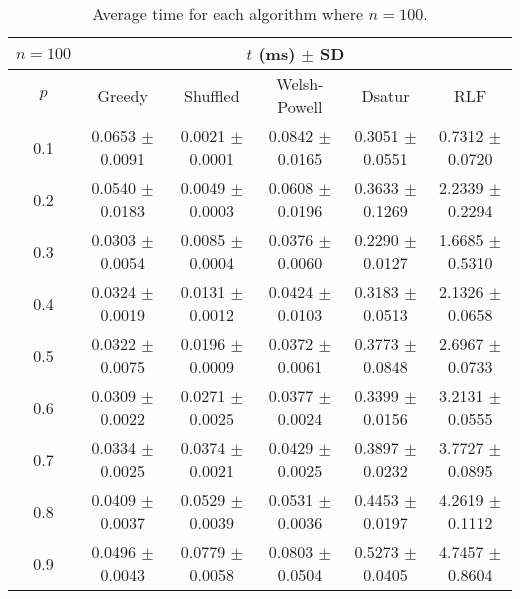 \begin{table}[H]
    \centering
    \begin{tabular}{cccccc}
        
        $n = 100$& \multicolumn{5}{c}{$t$ (\unit{ms}) $\pm$ SD} \\
        \hline
        $p$ & Greedy & Shuffled & Welsh-Powell & Dsatur & RLF \\
        \hline
         0.1 & 0.0653 $\pm$ 0.0091 & 0.0021 $\pm$ 0.0001 & 0.0842 $\pm$ 0.0165 & 0.3051 $\pm$ 0.0551 & 0.7312 $\pm$ 0.0720 \\
        0.2 & 0.0540 $\pm$ 0.0183 & 0.0049 $\pm$ 0.0003 & 0.0608 $\pm$ 0.0196 & 0.3633 $\pm$ 0.1269 & 2.2339 $\pm$ 0.2294 \\
        0.3 & 0.0303 $\pm$ 0.0054 & 0.0085 $\pm$ 0.0004 & 0.0376 $\pm$ 0.0060 & 0.2290 $\pm$ 0.0127 & 1.6685 $\pm$ 0.5310 \\
        0.4 & 0.0324 $\pm$ 0.0019 & 0.0131 $\pm$ 0.0012 & 0.0424 $\pm$ 0.0103 & 0.3183 $\pm$ 0.0513 & 2.1326 $\pm$ 0.0658 \\
        0.5 & 0.0322 $\pm$ 0.0075 & 0.0196 $\pm$ 0.0009 & 0.0372 $\pm$ 0.0061 & 0.3773 $\pm$ 0.0848 & 2.6967 $\pm$ 0.0733 \\
        0.6 & 0.0309 $\pm$ 0.0022 & 0.0271 $\pm$ 0.0025 & 0.0377 $\pm$ 0.0024 & 0.3399 $\pm$ 0.0156 & 3.2131 $\pm$ 0.0555 \\
        0.7 & 0.0334 $\pm$ 0.0025 & 0.0374 $\pm$ 0.0021 & 0.0429 $\pm$ 0.0025 & 0.3897 $\pm$ 0.0232 & 3.7727 $\pm$ 0.0895 \\
        0.8 & 0.0409 $\pm$ 0.0037 & 0.0529 $\pm$ 0.0039 & 0.0531 $\pm$ 0.0036 & 0.4453 $\pm$ 0.0197 & 4.2619 $\pm$ 0.1112 \\
        0.9 & 0.0496 $\pm$ 0.0043 & 0.0779 $\pm$ 0.0058 & 0.0803 $\pm$ 0.0504 & 0.5273 $\pm$ 0.0405 & 4.7457 $\pm$ 0.8604 \\ 
        \hline
    \end{tabular}
    \caption{Average time for each algorithm where $n = 100$.}
    \label{tab:avgTimeforV100}
\end{table}

